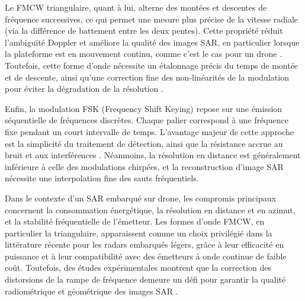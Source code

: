 Le FMCW triangulaire, quant à lui, alterne des montées et descentes de fréquence successives, ce qui permet une mesure plus précise de la vitesse radiale (via la différence de battement entre les deux pentes). Cette propriété réduit l’ambiguïté Doppler et améliore la qualité des images SAR, en particulier lorsque la plateforme est en mouvement continu, comme c’est le cas pour un drone \cite{meta2007performance}. Toutefois, cette forme d’onde nécessite un étalonnage précis du temps de montée et de descente, ainsi qu’une correction fine des non-linéarités de la modulation pour éviter la dégradation de la résolution \cite{aoki2020chirp}.

Enfin, la modulation FSK (Frequency Shift Keying) repose sur une émission séquentielle de fréquences discrètes. Chaque palier correspond à une fréquence fixe pendant un court intervalle de temps. L’avantage majeur de cette approche est la simplicité du traitement de détection, ainsi que la résistance accrue au bruit et aux interférences \cite{li2018fsk}. Néanmoins, la résolution en distance est généralement inférieure à celle des modulations chirpées, et la reconstruction d’image SAR nécessite une interpolation fine des sauts fréquentiels.

Dans le contexte d’un SAR embarqué sur drone, les compromis principaux concernent la consommation énergétique, la résolution en distance et en azimut, et la stabilité fréquentielle de l’émetteur. Les formes d’onde FMCW, en particulier la triangulaire, apparaissent comme un choix privilégié dans la littérature récente pour les radars embarqués légers, grâce à leur efficacité en puissance et à leur compatibilité avec des émetteurs à onde continue de faible coût. Toutefois, des études expérimentales montrent que la correction des distorsions de la rampe de fréquence demeure un défi pour garantir la qualité radiométrique et géométrique des images SAR \cite{sun2021fmcw, yang2023uavsar}.





